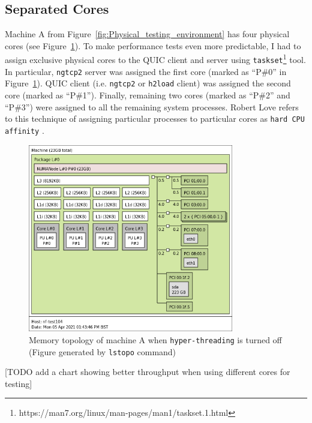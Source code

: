 \documentclass[12pt,a4paper,twoside,openright]{report}
\begin{document}
    
    
\subsection{Separated Cores} \label{SeparatedCores_Subsection_Tag}
Machine A from Figure~\ref{fig:Physical_testing_environment} has four physical cores (see Figure~\ref{fig:memory_topology}).
To make performance tests even more predictable, I had to assign exclusive physical cores to the QUIC client and server using \texttt{taskset}\footnote{https://man7.org/linux/man-pages/man1/taskset.1.html} tool.
In particular, \texttt{ngtcp2} server was assigned the first core (marked as \enquote{P\#0} in Figure~\ref{fig:memory_topology}).
QUIC client (i.e. \texttt{ngtcp2} or \texttt{h2load} client) was assigned the second core (marked as \enquote{P\#1}).
Finally, remaining two cores (marked as \enquote{P\#2} and \enquote{P\#3}) were assigned to all the remaining system processes.
Robert Love refers to this technique of assigning particular processes to particular cores as \texttt{hard CPU affinity} \cite{CPU_Affinity}.

    \begin{figure}[H]
    \centering
    \includegraphics[width=0.8\textwidth]{figs/memory_topology.png}
    \caption{Memory topology of machine A  when \texttt{hyper-threading} is turned off (Figure generated by \texttt{lstopo} command)}
    \label{fig:memory_topology}
    \end{figure}

[TODO add a chart showing better throughput when using different cores for testing]
\end{document}
